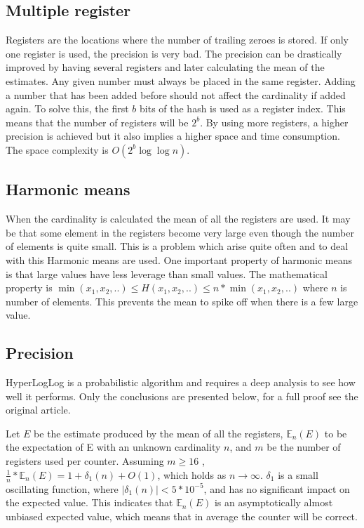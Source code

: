 \subsection{Multiple register}
Registers are the locations where the number of trailing zeroes is stored. If only one register is used, the precision is very bad. The precision can be drastically improved by having several registers and later calculating the mean of the estimates. Any given number must always be placed in the same register. Adding a number that has been added before should not affect the cardinality if added again. To solve this, the first $b$ bits of the hash is used as a register index. This means that the number of registers will be $2^b$. By using more registers, a higher precision is achieved but it also implies a higher space and time consumption. The space complexity is $O(2^b\log\log n)$. \cite{hyperloglog} 

\subsection{Harmonic means}
When the cardinality is calculated the mean of all the registers are used. It may be that some element in the registers become very large even though the number of elements is quite small. This is a problem which arise quite often and to deal with this Harmonic means are used. One important property of harmonic means is that large values have less leverage than small values. The mathematical property is $\min(x_1,x_2,..) \leq H(x_1,x_2,..) \leq n*\min(x_1,x_2,..)$ where $n$ is number of elements. This prevents the mean to spike off when there is a few large value.  

\subsection{Precision}
HyperLogLog is a probabilistic algorithm and requires a deep analysis to see how well it performs. Only the conclusions are presented below, for a full proof see the original article. 

Let $E$ be the estimate produced by the mean of all the registers, $\mathbb{E}_n(E)$ to be the expectation of E with an unknown cardinality $n$, and $m$ be the number of registers used per counter. Assuming $m \geq 16$ , $\frac{1}{n}*\mathbb{E}_n(E) = 1 + \delta_1(n) + O(1)$, which holds as $n \rightarrow \infty$. $\delta_1$ is a small oscillating function, where $|\delta_1(n)| < 5*10^{-5}$, and has no significant impact on the expected value. This indicates that $\mathbb{E}_n(E)$ is an asymptotically almost unbiased expected value, which means that in average the counter will be correct. 


